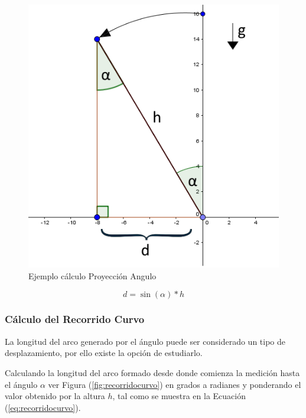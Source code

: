 \documentclass[12pt,a4paper]{article}
\begin{document}
\begin{figure}[H]
	\centering
	\includegraphics[scale=0.5]{images/calculoProyeccion}
	\caption{Ejemplo cálculo Proyección Angulo}
	\label{fig:proyeccion}
\end{figure}

\begin{equation}
	\label{eq:proyeccion}
	d=\sin(\alpha)*h
\end{equation}


\subsubsection{Cálculo del Recorrido Curvo}
La longitud del arco generado por el ángulo puede ser considerado un tipo de desplazamiento, por ello existe la opción de estudiarlo.

Calculando la longitud del arco formado desde donde comienza la medición hasta el ángulo $\alpha$ ver Figura (\ref{fig:recorridocurvo}) en grados a radianes y ponderando el valor obtenido por la altura $h$, tal como se muestra en la Ecuación (\ref{eq:recorridocurvo}).
\end{document}
